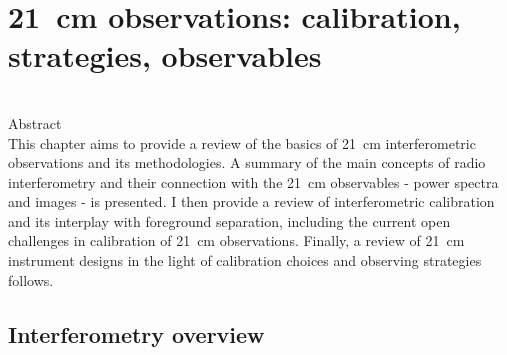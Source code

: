 \chapter{21~cm observations: calibration, strategies, observables}
\label{chapter:bernardi}

\begin{bf}
  \author{Gianni Bernardi (INAF-IRA \& Rhodes University)}\\
  
Abstract\\

This chapter aims to provide a review of the basics of 21~cm interferometric observations and its methodologies. A summary of the main concepts of radio interferometry and their connection with the 21~cm observables - power spectra and images - is presented. I then provide a review of interferometric calibration and its interplay with foreground separation, including the current open challenges in calibration of 21~cm observations. Finally, a review of 21~cm instrument designs in the light of calibration choices and observing strategies follows.
\end{bf}



\section{Interferometry overview}

